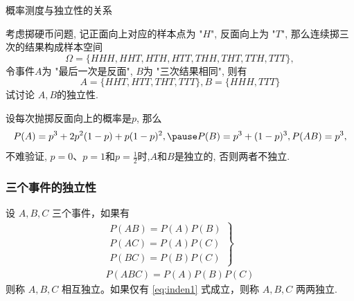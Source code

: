 \documentclass[Prob-All.tex]{subfiles}
\begin{document}
\begin{frame}{概率测度与独立性的关系}
  \begin{exam}
    考虑掷硬币问题, 记正面向上对应的样本点为 "$H$", 反面向上为 "$T$", 那么连续掷三次的结果构成样本空间
  \[
  \Omega=\{H H H, H H T, H T H, H T T, T H H, T H T, T T H, T T T\},
  \]
    令事件$A$为 "最后一次是反面", $B$为 "三次结果相同", 则有
  \[
  A=\{H H T, H T T, T H T, T T T\},  B=\{H H H, T T T\}
  \]试讨论 $A, B$的独立性.
  \end{exam}
\pause

\jieda 设每次抛掷反面向上的概率是$p$, 那么\pause
\[
P(A)=p^{3}+2 p^{2}(1-p)+p(1-p)^{2}, \pause  P(B)=p^{3}+(1-p)^{3},  P(A B)=p^{3},
\]
\pause
不难验证, $p=0$、$p=1$和$p=\frac{1}{2}$时,$A$和$B$是独立的, 否则两者不独立.


\end{frame}







   \begin{frame}
	\frametitle{三个事件的独立性}
	\begin{defi}
		设 $A,B,C$ 三个事件，如果有
		\begin{eqnarray}\label{eq:inden1}
			\left.\begin{array}{l}
				P(AB)=P(A)P(B)\\
				P(AC)=P(A)P(C) \\
				P(BC)=P(B)P(C)
			\end{array}\right\}\\
			\label{eq:inden2}
			P(ABC)=P(A)P(B)P(C)
		\end{eqnarray}
		则称 $A,B,C$ 相互独立。如果仅有 \eqref{eq:inden1} 式成立，则称 $A,B,C$ 两两独立.
	\end{defi}
\end{frame}
\end{document}
